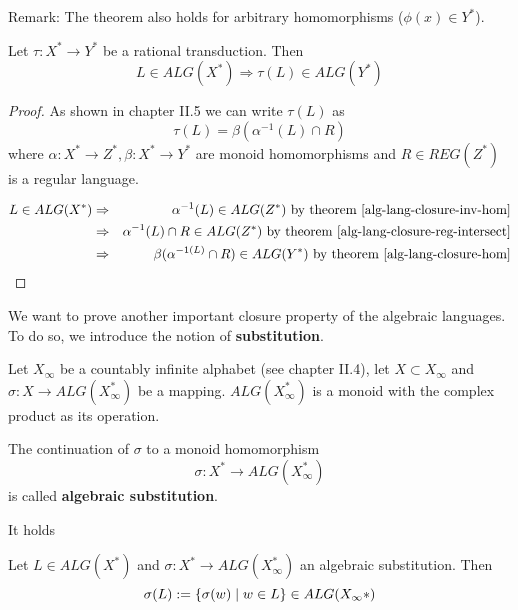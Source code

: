 Remark: The theorem also holds for arbitrary homomorphisms ($\phi(x) \in Y^*$).

\begin{corollary}
Let $\tau: X^* \to Y^*$ be a rational transduction. Then
\[ L\in ALG(X^*)\Rightarrow \tau(L)\in ALG(Y^*) \]
\end{corollary}

\begin{proof}
As shown in chapter II.5 we can write $\tau(L)$ as
\[ \tau(L)=\beta(\alpha^{-1}(L)\cap R) \]
where $\alpha : X^*\to Z^*, \beta: X^*\to Y^*$ are monoid homomorphisms and
$R\in REG(Z^*)$ is a regular language.

\begin{eqnarray*}
L\in ALG(X^*) &\Rightarrow& \alpha^{-1}(L)\in ALG(Z^*)\text{ by theorem
\ref{alg-lang-closure-inv-hom}}\\
&\Rightarrow& \alpha^{-1}(L)\cap R\in ALG(Z^*)\text{ by theorem
\ref{alg-lang-closure-reg-intersect}}\\
&\Rightarrow& \beta(\alpha^{-1(L)}\cap R)\in ALG(Y^*)\text{ by theorem
\ref{alg-lang-closure-hom}}
\end{eqnarray*}
\end{proof}

\bigskip
We want to prove another important closure property of the algebraic languages.
To do so, we introduce the notion of {\bf substitution}.

\begin{definition}
Let $X_\infty$ be a countably infinite alphabet (see chapter II.4), let $X
\subset X_\infty$ and $\sigma:X\to ALG(X_\infty^*)$ be a mapping.
$ALG(X_\infty^*)$ is a monoid with the complex product as its operation.

The continuation of $\sigma$ to a monoid homomorphism 
\[ \sigma: X^*\to ALG(X_\infty^*) \]
is called {\bf algebraic substitution}.
\end{definition}

It holds
\begin{theorem}
Let $L\in ALG(X^*)$ and $\sigma: X^*\to ALG(X_\infty^*)$ an algebraic
substitution. Then
\[ \sigma(L) := \mbox{$\{\sigma(w)\mid w\in L\}$} \in ALG(X_\infty*) \]
\end{theorem}

